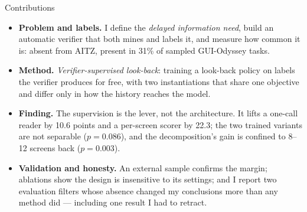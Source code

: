 \documentclass[aspectratio=169,10pt]{beamer}
\begin{document}
\begin{frame}{Contributions}
\vspace{0.35cm}
\begin{itemize}\setlength\itemsep{0.62em}
\item \textbf{Problem and labels.} I define the \emph{delayed information need}, build an automatic verifier that both mines and labels it, and measure how common it is: absent from AITZ, present in 31\% of sampled GUI-Odyssey tasks.
\item \textbf{Method.} \emph{Verifier-supervised look-back}: training a look-back policy on labels the verifier produces for free, with two instantiations that share one objective and differ only in how the history reaches the model.
\item \textbf{Finding.} The supervision is the lever, not the architecture. It lifts a one-call reader by 10.6 points and a per-screen scorer by 22.3; the two trained variants are not separable ($p=0.086$), and the decomposition's gain is confined to 8--12 screens back ($p=0.003$).
\item \textbf{Validation and honesty.} An external sample confirms the margin; ablations show the design is insensitive to its settings; and I report two evaluation filters whose absence changed my conclusions more than any method did --- including one result I had to retract.
\end{itemize}
\end{frame}
\end{document}

